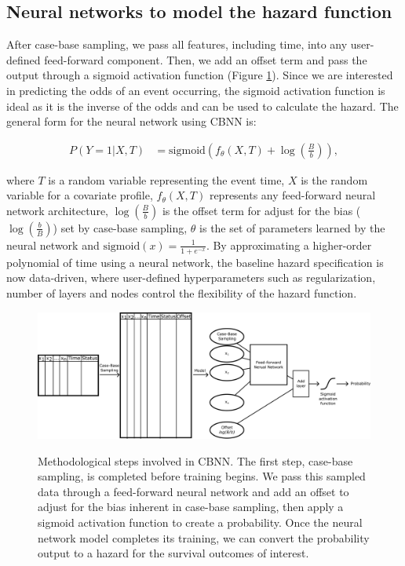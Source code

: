 \documentclass[APA,LATO1COL]{WileyNJD-v2}
\begin{document}
\hypertarget{neural-networks-to-model-the-hazard-function}{%
\subsection{Neural networks to model the hazard
function}\label{neural-networks-to-model-the-hazard-function}}

After case-base sampling, we pass all features, including time, into any user-defined feed-forward
component. Then, we add an offset term and pass the output through a sigmoid activation function
(Figure \ref{fig:NNarch}). Since we are interested in predicting the odds of an event occurring, the sigmoid
activation function is ideal as it is the inverse of the odds and can be used to calculate the hazard. The
general form for the neural network using CBNN is:

\begin{align*}
P\left(Y=1|X,T\right)&=\mathrm{sigmoid}\left(f_{\theta}(X, T) + \log\left(\frac{B}{b}\right) \right),
\end{align*}

where \(T\) is a random variable representing the event time, \(X\) is the random variable for a covariate
profile, \(f_{\theta}(X, T)\) represents any feed-forward neural network architecture, \(\log\left(\frac{B}{b}\right)\)
is the offset term for adjust for the bias (\(\log\left(\frac{b}{B}\right)\)) set by case-base sampling, \(\theta\) is the
set of parameters learned by the neural network and \(\mathrm{sigmoid}(x)=\frac{1}{1+e^{-x}}\). By approximating
a higher-order polynomial of time using a neural network, the baseline hazard specification is now data-driven,
where user-defined hyperparameters such as regularization, number of layers and nodes control the flexibility
of the hazard function. 

\begin{figure}

{\centering \includegraphics[width=1\linewidth]{../figures/Figure1.pdf}}

\caption{Methodological steps involved in CBNN. The first step, case-base sampling, is completed before training begins.
We pass this sampled data through a feed-forward neural network and add an offset to adjust for the bias inherent in
case-base sampling, then apply a sigmoid activation function to create a probability. Once the neural network model
completes its training, we can convert the probability output to a hazard for the survival outcomes of interest.}\label{fig:NNarch}
\end{figure}
\end{document}
